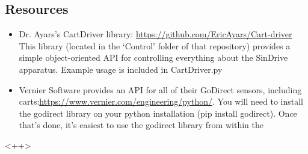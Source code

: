 \documentclass[11 pt]{article}
\begin{document}
\subsection*{Resources}
\begin{itemize}
	\item Dr. Ayars's CartDriver library: \url{https://github.com/EricAyars/Cart-driver}
		This library (located in the `Control' folder of that repository) provides a simple object-oriented API for controlling everything about the SinDrive apparatus.
		Example usage is included in CartDriver.py
	\item Vernier Software provides an API for all of their GoDirect sensors, including carts:\url{https://www.vernier.com/engineering/python/}. You will need to install the godirect library on your python installation (pip install godirect). 
		Once that's done, it's easiest to use the godirect library from within the 
\end{itemize}<++>
\end{document}
